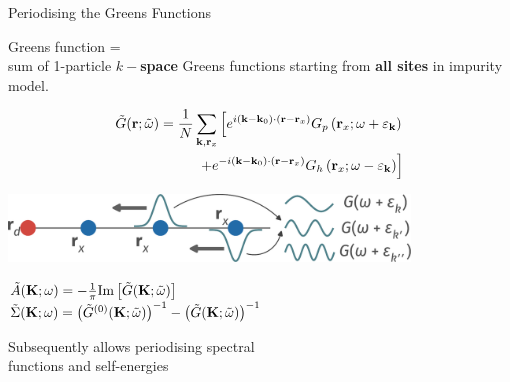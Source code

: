\documentclass[12pt,aspectratio=169]{beamer}
\newcommand\focus[1]{%
	{\alert{\textbf{#1}}}
}
\begin{document}
\begin{frame}{Periodising the Greens Functions}
	\begin{minipage}{0.4\textwidth}
	Greens function = \\
	sum of 1-particle \focus{\(k-\)space} Greens functions starting from \focus{all sites} in impurity model.
	\end{minipage}
	\hspace{\fill}
	\begin{minipage}{0.54\textwidth}
	\begin{equation*}\begin{aligned}
		\tilde G({\bf r}; \tilde\omega) = \frac{1}{N}\sum_{{\bf k},{\bf r}_x} \left[e^{i \left({\bf k}- {\bf k}_0\right)\cdot\left({\bf r} - {\bf r}_x\right)}G_p\left({\bf r}_x;\omega + \varepsilon_{\bf k}\right) \right. \\
	\left. + e^{-i \left({\bf k}- {\bf k}_0\right)\cdot\left({\bf r} - {\bf r}_x\right)}G_h\left({\bf r}_x;\omega - \varepsilon_{\bf k}\right)\right]
	\end{aligned}\end{equation*}
	\end{minipage}

	\vspace*{\fill}
	\includegraphics[width=0.8\textwidth]{greensFunc.pdf}

	\vspace*{\fill}
	\begin{minipage}{0.45\textwidth}
	\(\tilde A({\bf K}; \omega )= -\frac{1}{\pi}\text{Im}\left[\tilde G({\bf K}; \tilde\omega)\right]\)\\
	\(\tilde \Sigma({\bf K}; \omega) = \left(\tilde G^{(0)}({\bf K}; \tilde\omega)\right)^{-1} - \left(\tilde G({\bf K}; \tilde\omega)\right)^{-1}\)
	\end{minipage}
	\hspace{\fill}
	\begin{minipage}{0.5\textwidth}
	Subsequently allows periodising spectral \\ 
	functions and self-energies
	\end{minipage}
	
\end{frame}
\end{document}
